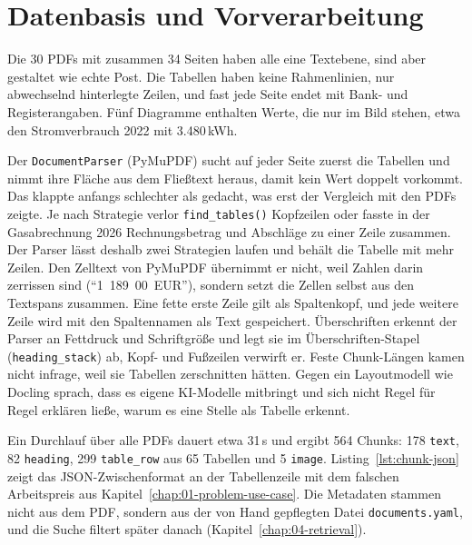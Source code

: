 
\chapter{Datenbasis und Vorverarbeitung}
\label{chap:02-data-preprocessing}


Die 30 PDFs mit zusammen 34 Seiten haben alle eine Textebene, sind aber gestaltet wie echte Post. Die Tabellen haben keine Rahmenlinien, nur abwechselnd hinterlegte Zeilen, und fast jede Seite endet mit Bank- und Registerangaben. Fünf Diagramme enthalten Werte, die nur im Bild stehen, etwa den Stromverbrauch 2022 mit 3.480\,kWh.

Der \texttt{DocumentParser} (PyMuPDF) sucht auf jeder Seite zuerst die Tabellen und nimmt ihre Fläche aus dem Fließtext heraus, damit kein Wert doppelt vorkommt. Das klappte anfangs schlechter als gedacht, was erst der Vergleich mit den PDFs zeigte. Je nach Strategie verlor \texttt{find\_tables()} Kopfzeilen oder fasste in der Gasabrechnung 2026 Rechnungsbetrag und Abschläge zu einer Zeile zusammen. Der Parser lässt deshalb zwei Strategien laufen und behält die Tabelle mit mehr Zeilen. Den Zelltext von PyMuPDF übernimmt er nicht, weil Zahlen darin zerrissen sind (\enquote{1~189~00~EUR}), sondern setzt die Zellen selbst aus den Textspans zusammen. Eine fette erste Zeile gilt als Spaltenkopf, und jede weitere Zeile wird mit den Spaltennamen als Text gespeichert. Überschriften erkennt der Parser an Fettdruck und Schriftgröße und legt sie im Überschriften-Stapel (\texttt{heading\_stack}) ab, Kopf- und Fußzeilen verwirft er. Feste Chunk-Längen kamen nicht infrage, weil sie Tabellen zerschnitten hätten. Gegen ein Layoutmodell wie Docling sprach, dass es eigene KI-Modelle mitbringt und sich nicht Regel für Regel erklären ließe, warum es eine Stelle als Tabelle erkennt.

Ein Durchlauf über alle PDFs dauert etwa 31\,s und ergibt 564 Chunks: 178 \texttt{text}, 82 \texttt{heading}, 299 \texttt{table\_row} aus 65 Tabellen und 5 \texttt{image}. Listing~\ref{lst:chunk-json} zeigt das JSON-Zwischenformat an der Tabellenzeile mit dem falschen Arbeitspreis aus Kapitel~\ref{chap:01-problem-use-case}. Die Metadaten stammen nicht aus dem PDF, sondern aus der von Hand gepflegten Datei \texttt{documents.yaml}, und die Suche filtert später danach (Kapitel~\ref{chap:04-retrieval}).

